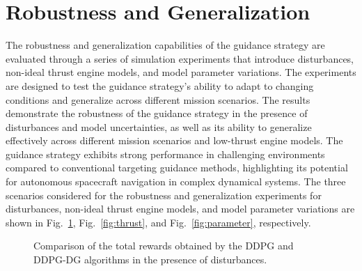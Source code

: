 \documentclass[conference]{IEEEtran}
\begin{document}
\section{Robustness and Generalization}
The robustness and generalization capabilities of the guidance strategy are evaluated through a series of simulation experiments that introduce disturbances, non-ideal thrust engine models, and model parameter variations. The experiments are designed to test the guidance strategy's ability to adapt to changing conditions and generalize across different mission scenarios. The results demonstrate the robustness of the guidance strategy in the presence of disturbances and model uncertainties, as well as its ability to generalize effectively across different mission scenarios and low-thrust engine models. The guidance strategy exhibits strong performance in challenging environments compared to conventional targeting guidance methods, highlighting its potential for autonomous spacecraft navigation in complex dynamical systems.
The three scenarios considered for the robustness and generalization experiments for disturbances, non-ideal thrust engine models, and model parameter variations are shown in Fig.~\ref{fig:disturbance}, Fig.~\ref{fig:thrust}, and Fig.~\ref{fig:parameter}, respectively.



\begin{figure}[!h]
  \caption{
	Comparison of the total rewards obtained by the DDPG and DDPG-DG algorithms in the presence of disturbances.
}\label{fig:disturbance}
\end{figure}
\end{document}
